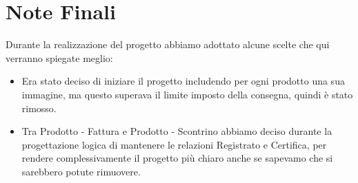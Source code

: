 \section{Note Finali}
Durante la realizzazione del progetto abbiamo adottato alcune scelte che qui verranno spiegate meglio:
\begin{itemize}
\item Era stato deciso di iniziare il progetto includendo per ogni prodotto una sua immagine, ma questo superava il limite imposto della consegna, quindi \`e stato rimosso.

\item Tra Prodotto - Fattura e Prodotto - Scontrino abbiamo deciso durante la progettazione logica di mantenere le relazioni Registrato e Certifica, per rendere complessivamente il progetto pi\`u chiaro anche se sapevamo che si sarebbero potute rimuovere.

\end{itemize}
